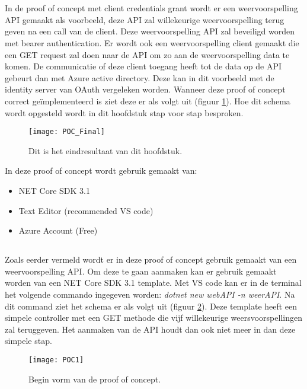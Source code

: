 \section{}
\label{sec:Client_Credentials_Grant}
In de proof of concept met client credentials grant wordt er een weervoorspelling API gemaakt als voorbeeld, deze API zal willekeurige weervoorspelling terug geven na een call van de client. Deze weervoorspelling API zal beveiligd worden met bearer authentication. Er wordt ook een weervoorspelling client gemaakt die een GET request zal doen naar de API om zo aan de weervoorspelling data te komen. De communicatie of deze client toegang heeft tot de data op de API gebeurt dan met Azure active directory. Deze kan in dit voorbeeld met de identity server van OAuth vergeleken worden. Wanneer deze proof of concept correct geïmplementeerd is ziet deze er als volgt uit (figuur \ref{fig:pocfinal}). Hoe dit schema wordt opgesteld wordt in dit hoofdstuk stap voor stap besproken.
\begin{figure}[H]
	\centering
	\texttt{[image: POC\_Final]} 
	\caption[Dit is het eindresultaat van dit hoofdstuk]{Dit is het eindresultaat van dit hoofdstuk.}
	\label{fig:pocfinal}
\end{figure}
In deze proof of concept wordt gebruik gemaakt van:	
\begin{itemize}
	\item NET Core SDK 3.1
	\item Text Editor (recommended VS code)
	\item Azure Account (Free)
\end{itemize}
\subsection{}
Zoals eerder vermeld wordt er in deze proof of concept gebruik gemaakt van een weervoorspelling API. Om deze te gaan aanmaken kan er gebruik gemaakt worden van een NET Core SDK 3.1 template. Met VS code kan er in de terminal het volgende commando ingegeven worden: \emph{dotnet new webAPI -n weerAPI}.\newline
Na dit command ziet het schema er als volgt uit (figuur \ref{fig:poc1}). Deze template heeft een simpele controller met een GET methode die vijf willekeurige weersvoorspellingen zal teruggeven. Het aanmaken van de API houdt dan ook niet meer in dan deze simpele stap.
\begin{figure}[H]
	\centering
	\texttt{[image: POC1]} 
	\caption[BeginPOC]{Begin vorm van de proof of concept.}
	\label{fig:poc1}
\end{figure}
